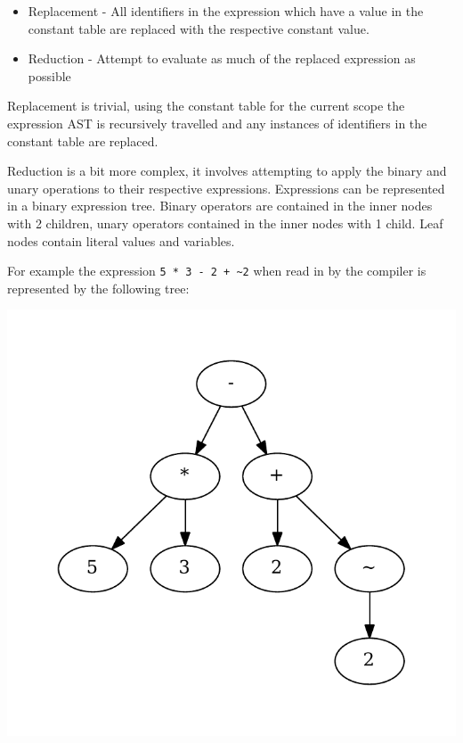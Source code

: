 \begin{itemize}
    \item Replacement - All identifiers in the expression which have a value in the constant table are
          replaced with the respective constant value.

    \item Reduction - Attempt to evaluate as much of the replaced expression as possible

\end{itemize}

Replacement is trivial, using the constant table for the current scope the
expression AST is recursively travelled and any instances of identifiers
in the constant table are replaced.


Reduction is a bit more complex, it involves attempting to apply the binary
and unary operations to their respective expressions. Expressions can be
represented in a binary expression tree. Binary operators are contained in
the inner nodes with 2 children, unary operators contained in the inner
nodes with 1 child. Leaf nodes contain literal values and variables.

For example the expression \texttt{5 * 3 - 2 + \textasciitilde2} when read in by the
compiler is represented by the following tree:

\begin{center}
\includegraphics[scale=0.5]{graphs/impleval.pdf}
\end{center}


